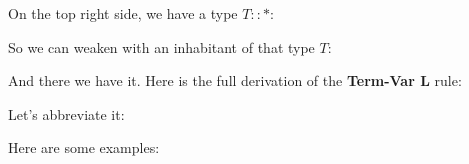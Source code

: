 \documentclass{book}
\numberwithin{equation}{chapter}
\newcommand{\vocab}{\textbf}
\begin{document}
\noindent
On the top right side, we have a type $T :: \ast$:

\begin{prooftree}


\end{prooftree}

\noindent
So we can weaken with an inhabitant of that type $T$:

\begin{prooftree}


\end{prooftree}

\noindent
And there we have it. Here is the full derivation of the \vocab{Term-Var L} rule:

\begin{prooftree}


\end{prooftree}

\noindent
Let's abbreviate it:

\begin{prooftree}
\end{prooftree}

\noindent
Here are some examples:

\begin{prooftree}
\end{prooftree}


\begin{prooftree}
\end{prooftree}


\end{document}
